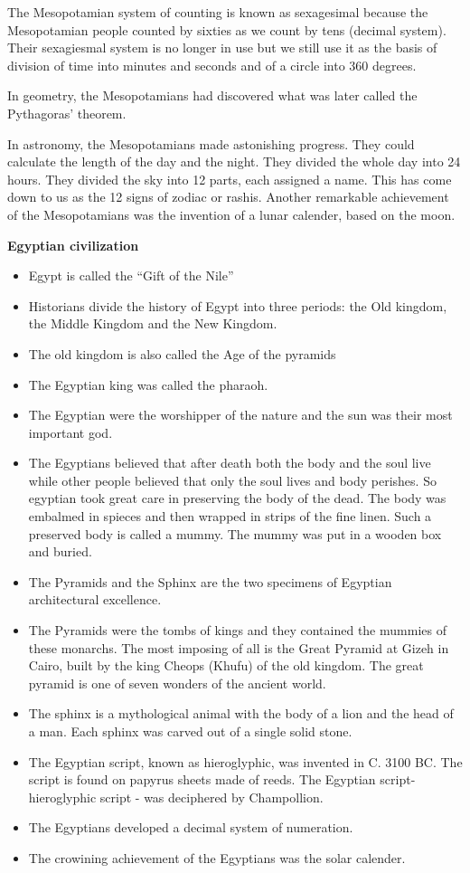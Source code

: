 \documentclass[
  openany]{book}
\providecommand{\tightlist}{%
  \setlength{\itemsep}{0pt}\setlength{\parskip}{0pt}}
\begin{document}
The Mesopotamian system of counting is known as sexagesimal because the Mesopotamian people counted by sixties as we count by tens (decimal system). Their sexagiesmal system is no longer in use but we still use it as the basis of division of time into minutes and seconds and of a circle into 360 degrees.

In geometry, the Mesopotamians had discovered what was later called the Pythagoras' theorem.

In astronomy, the Mesopotamians made astonishing progress. They could calculate the length of the day and the night. They divided the whole day into 24 hours. They divided the sky into 12 parts, each assigned a name. This has come down to us as the 12 signs of zodiac or rashis. Another remarkable achievement of the Mesopotamians was the invention of a lunar calender, based on the moon.

\textbf{Egyptian civilization}

\begin{itemize}
\tightlist
\item
  Egypt is called the ``Gift of the Nile''
\item
  Historians divide the history of Egypt into three periods: the Old kingdom, the Middle Kingdom and the New Kingdom.
\item
  The old kingdom is also called the Age of the pyramids
\item
  The Egyptian king was called the pharaoh.
\item
  The Egyptian were the worshipper of the nature and the sun was their most important god.
\item
  The Egyptians believed that after death both the body and the soul live while other people believed that only the soul lives and body perishes. So egyptian took great care in preserving the body of the dead. The body was embalmed in spieces and then wrapped in strips of the fine linen. Such a preserved body is called a mummy. The mummy was put in a wooden box and buried.
\item
  The Pyramids and the Sphinx are the two specimens of Egyptian architectural excellence.
\item
  The Pyramids were the tombs of kings and they contained the mummies of these monarchs. The most imposing of all is the Great Pyramid at Gizeh in Cairo, built by the king Cheops (Khufu) of the old kingdom. The great pyramid is one of seven wonders of the ancient world.
\item
  The sphinx is a mythological animal with the body of a lion and the head of a man. Each sphinx was carved out of a single solid stone.
\item
  The Egyptian script, known as hieroglyphic, was invented in C. 3100 BC. The script is found on papyrus sheets made of reeds. The Egyptian script-hieroglyphic script - was deciphered by Champollion.
\item
  The Egyptians developed a decimal system of numeration.
\item
  The crowining achievement of the Egyptians was the solar calender.
\end{itemize}
\end{document}

